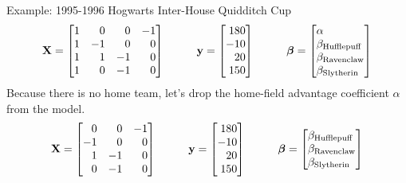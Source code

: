 \documentclass{article}
\begin{document}
  \begin{framed}
    {\sc Example:} 1995-1996 Hogwarts Inter-House Quidditch Cup\\
    $$
      {\bf X} = \begin{bmatrix*}[r]
        1 &  0 &  0 & -1\\
        1 & -1 &  0 &  0\\
        1 &  1 & -1 &  0\\
        1 &  0 & -1 &  0\\
      \end{bmatrix*}
      \hspace{1cm}
      {\bf y} = \begin{bmatrix*}[r] 180 \\ -10 \\ 20 \\ 150 \end{bmatrix*}
      \hspace{1cm}
      \boldsymbol{\beta} = \begin{bmatrix*}[l]
        \alpha \\
        \beta_{\mbox{\scriptsize Hufflepuff}} \\
        \beta_{\mbox{\scriptsize Ravenclaw}} \\
        \beta_{\mbox{\scriptsize Slytherin}}
      \end{bmatrix*}
    $$
    Because there is no home team, let's drop the home-field advantage coefficient $\alpha$ from the model.
    $$
      {\bf X} = \begin{bmatrix*}[r]
         0 &  0 & -1\\
        -1 &  0 &  0\\
         1 & -1 &  0\\
         0 & -1 &  0\\
      \end{bmatrix*}
      \hspace{1cm}
      {\bf y} = \begin{bmatrix*}[r] 180 \\ -10 \\ 20 \\ 150 \end{bmatrix*}
      \hspace{1cm}
      \boldsymbol{\beta} = \begin{bmatrix*}[l]
        \beta_{\mbox{\scriptsize Hufflepuff}} \\
        \beta_{\mbox{\scriptsize Ravenclaw}} \\
        \beta_{\mbox{\scriptsize Slytherin}}
      \end{bmatrix*}
    $$


\end{framed}
\end{document}
